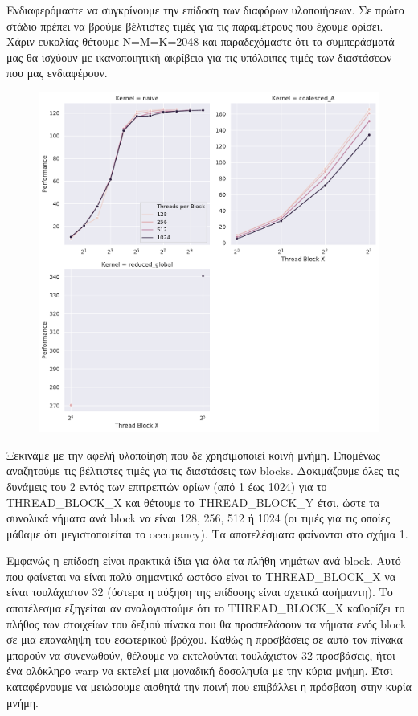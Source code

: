 \documentclass[titlepage]{article}
\begin{document}
Ενδιαφερόμαστε να συγκρίνουμε την επίδοση των διαφόρων υλοποιήσεων. Σε πρώτο στάδιο πρέπει να βρούμε βέλτιστες τιμές για τις παραμέτρους που έχουμε ορίσει. Χάριν ευκολίας θέτουμε N=M=K=2048 και παραδεχόμαστε ότι τα συμπεράσματά μας θα ισχύουν με ικανοποιητική ακρίβεια για τις υπόλοιπες τιμές των διαστάσεων που μας ενδιαφέρουν.

\begin{figure}[h!]
    \includegraphics[width=\textwidth]{z1.pdf}
    \caption{}
\end{figure}

Ξεκινάμε με την αφελή υλοποίηση που δε χρησιμοποιεί κοινή μνήμη. Επομένως αναζητούμε τις βέλτιστες τιμές για τις διαστάσεις των blocks. Δοκιμάζουμε όλες τις δυνάμεις του 2 εντός των επιτρεπτών ορίων (από 1 έως 1024) για το THREAD\_BLOCK\_X και θέτουμε το THREAD\_BLOCK\_Y έτσι, ώστε τα συνολικά νήματα ανά block να είναι 128, 256, 512 ή 1024 (οι τιμές για τις οποίες μάθαμε ότι μεγιστοποιείται το occupancy). Τα αποτελέσματα φαίνονται στο σχήμα 1.

Εμφανώς η επίδοση είναι πρακτικά ίδια για όλα τα πλήθη νημάτων ανά block. Αυτό που φαίνεται να είναι πολύ σημαντικό ωστόσο είναι το THREAD\_BLOCK\_X να είναι τουλάχιστον 32 (ύστερα η αύξηση της επίδοσης είναι σχετικά ασήμαντη). Το αποτέλεσμα εξηγείται αν αναλογιστούμε ότι το THREAD\_BLOCK\_X καθορίζει το πλήθος των στοιχείων του δεξιού πίνακα που θα προσπελάσουν τα νήματα ενός block σε μια επανάληψη του εσωτερικού βρόχου. Καθώς η προσβάσεις σε αυτό τον πίνακα μπορούν να συνενωθούν, θέλουμε να εκτελούνται τουλάχιστον 32 προσβάσεις, ήτοι ένα ολόκληρο warp να εκτελεί μια μοναδική δοσοληψία με την κύρια μνήμη. Έτσι καταφέρνουμε να μειώσουμε αισθητά την ποινή που επιβάλλει η πρόσβαση στην κυρία μνήμη.
\end{document}
